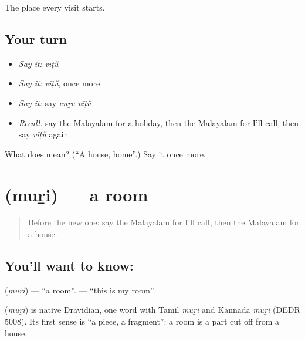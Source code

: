 \begin{grammarlens}[title={What you've built}]
The place every visit starts.
\end{grammarlens}

\subsection*{Your turn}
\begin{itemize}
\raggedright
  \item \emph{Say it:} \emph{vīṭŭ}
  \item \emph{Say it:} \emph{vīṭŭ}, once more
  \item \emph{Say it:} say \emph{enṟe vīṭŭ}
  \item \emph{Recall:} say the Malayalam for a holiday, then the Malayalam for I'll call, then say \emph{vīṭŭ} again
\end{itemize}

\begin{tcolorbox}[breakable,colback=teal!4,colframe=teal!35!black,title={Before you move on}]
What does  mean? (\textquotedblleft{}A house, home\textquotedblright{}.) Say it once more.
\end{tcolorbox}
\section[\texorpdfstring{\ml{മുറി} (muṟi)}{മുറി (muṟi)}]{ (muṟi) — a room}

\label{lesson:ML-C128-room}



\begin{quote}
Before the new one: say the Malayalam for I'll call, then the Malayalam for a house.
\end{quote}

\subsection*{You'll want to know: }
\textbf{} (\emph{muṟi}) — \textquotedblleft{}a room\textquotedblright{}. \textbf{  } — \textquotedblleft{}this is my room\textquotedblright{}.

\begin{cousinweb}
\textbf{} (\emph{muṟi}) is native Dravidian, one word with Tamil \emph{muṟi} and Kannada \emph{muṟi} (DEDR 5008). Its first sense is \textquotedblleft{}a piece, a fragment\textquotedblright{}: a room is a part cut off from a house.
\end{cousinweb}


